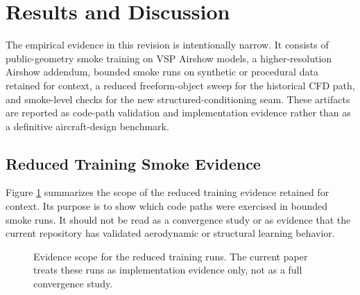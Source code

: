 \section{Results and Discussion}
\label{sec:results}
The empirical evidence in this revision is intentionally narrow. It consists of public-geometry smoke training on VSP Airshow models, a higher-resolution Airshow addendum, bounded smoke runs on synthetic or procedural data retained for context, a reduced freeform-object sweep for the historical CFD path, and smoke-level checks for the new structured-conditioning seam. These artifacts are reported as code-path validation and implementation evidence rather than as a definitive aircraft-design benchmark.

\subsection{Reduced Training Smoke Evidence}
Figure \ref{fig:loss_curves} summarizes the scope of the reduced training evidence retained for context. Its purpose is to show which code paths were exercised in bounded smoke runs. It should not be read as a convergence study or as evidence that the current repository has validated aerodynamic or structural learning behavior.

\begin{figure}[!t]
\centering
{}
\caption{Evidence scope for the reduced training runs. The current paper treats these runs as implementation evidence only, not as a full convergence study.}
\label{fig:loss_curves}
\end{figure}

